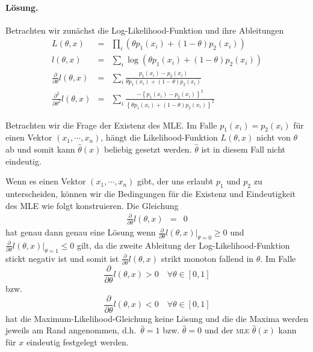 \paragraph*{Lösung. } 
Betrachten wir zunächst die Log-Likelihood-Funktion und ihre Ableitungen
\begin{eqnarray}
	L(\theta, x) &=&  \prod_i \left( \theta p_1(x_i) + \left( 1-\theta \right)p_2(x_i) \right) \\
	l(\theta, x) &=& \sum_{i}^{} \log \left( \theta p_1(x_i) + \left( 1-\theta \right) p_2(x_i) \right) \\
	\frac{\partial}{\partial \theta} l(\theta,x) &=&  \sum_{i}^{} \frac{p_1(x_i)-p_2(x_i)}{\theta p_1(x_i) +\left( 1-\theta \right)p_2(x_i)} \\
	\frac{\partial^2}{\partial \theta^2} l(\theta,x) &=& \sum_{i}^{} \frac{ -\left\{ p_1(x_i)-p_2(x_i) \right\}^2 }{ \left\{ \theta p_1(x_i) +\left( 1-\theta \right)p_2(x_i) \right\}^2 }
\end{eqnarray}

Betrachten wir die Frage der Existenz des MLE. Im Falle $p_1(x_i)=p_2(x_i)$ für
einen Vektor $\left( x_1,\cdots,x_n \right)$, hängt die Likelihood-Funktion
$L\left( \theta ,x \right)$ nicht von $\theta$ ab und somit kann
$\hat\theta(x)$ beliebig gesetzt werden. $\hat\theta$ ist in diesem Fall nicht
eindeutig.

Wenn es einen Vektor $\left( x_1,\cdots,x_n \right)$ gibt, der uns erlaubt $p_1$ und $p_2$ zu unterscheiden,
können wir die Bedingungen für die Existenz und Eindeutigkeit des MLE wie folgt konstruieren. 
Die Gleichung
\begin{eqnarray}
	\frac{\partial}{\partial \theta} l(\theta,x) &=& 0
\end{eqnarray}
hat genau dann genau  eine Lösung wenn $ \frac{\partial}{\partial \theta} l(\theta,x)|_{\theta=0}\geq 0$ und
$ \frac{\partial}{\partial \theta} l(\theta,x)|_{\theta=1}\leq 0$ gilt, da die zweite Ableitung
der Log-Likelihood-Funktion stickt negativ ist und somit ist $ \frac{\partial}{\partial \theta} l(\theta,x)$ 
strikt monoton fallend in $\theta$.
Im Falle
\begin{equation}
	 \frac{\partial}{\partial \theta} l(\theta,x) > 0 \quad \forall \theta\in\left[ 0,1 \right]
\end{equation}
bzw.
\begin{equation}
	 \frac{\partial}{\partial \theta} l(\theta,x) < 0 \quad \forall \theta\in\left[ 0,1 \right]
\end{equation}
hat die Maximum-Likelihood-Gleichung keine Lösung und die
die Maxima werden jeweils am Rand angenommen, d.h.\ $\hat\theta=1$ bzw. $\hat\theta=0$ und 
der \textsc{mle} $\hat\theta(x)$ kann für $x$ eindeutig festgelegt werden.




